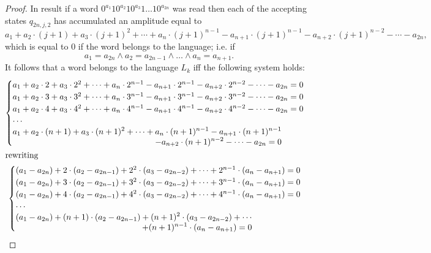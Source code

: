 \documentclass{llncs}
\begin{document}
\begin{proof}
In result if a word $0^{a_1}10^{a_2}10^{a_3}1\ldots 10^{a_{2n}}$ was read then each of the accepting states $q_{2n,j,2}$ has accumulated an amplitude equal to
\[
	a_1 + a_2 \cdot (j + 1) + a_3 \cdot (j + 1)^2 + \cdots + a_n \cdot (j + 1)^{n - 1} - a_{n+1} \cdot (j + 1)^{n - 1} - a_{n+2} \cdot (j + 1)^{n - 2} - \cdots - a_{2n},
\]
which is equal to $0$ if the word belongs to the language; i.e. if
\[
	a_1 = a_{2n} \wedge a_2 = a_{2n-1} \wedge \ldots \wedge a_n = a_{n+1}.
\]
It follows that a word belongs to the language $L_k$ iff the following system holds:
\begin{gather*}
\allowdisplaybreaks
	\begin{cases}
		a_1 + a_2 \cdot 2 + a_3 \cdot 2^2 + \cdots + a_n \cdot 2^{n - 1} - a_{n+1} \cdot 2^{n - 1} - a_{n+2} \cdot 2^{n - 2} - \cdots - a_{2n} = 0 \\
		a_1 + a_2 \cdot 3 + a_3 \cdot 3^2 + \cdots + a_n \cdot 3^{n - 1} - a_{n+1} \cdot 3^{n - 1} - a_{n+2} \cdot 3^{n - 2} - \cdots - a_{2n} = 0\\
		a_1 + a_2 \cdot 4 + a_3 \cdot 4^2 + \cdots + a_n \cdot 4^{n - 1} - a_{n+1} \cdot 4^{n - 1} - a_{n+2} \cdot 4^{n - 2} - \cdots - a_{2n} = 0\\
		\cdots \\
		\begin{split}
		a_1 + a_2 \cdot (n + 1) + a_3 \cdot (n + 1)^2 + \cdots + a_n \cdot (n + 1)^{n - 1} - a_{n+1} \cdot (n + 1)^{n - 1} \\
		\qquad- a_{n+2} \cdot (n + 1)^{n - 2} - \cdots - a_{2n} = 0\\
		\end{split}
	\end{cases}\\
\intertext{rewriting}
	\begin{cases}
		(a_1 - a_{2n}) + 2 \cdot (a_2 - a_{2n-1}) + 2^2 \cdot (a_3 - a_{2n-2}) + \cdots + 2^{n - 1} \cdot (a_n - a_{n+1}) = 0\\
		(a_1 - a_{2n}) + 3 \cdot (a_2 - a_{2n-1}) + 3^2 \cdot (a_3 - a_{2n-2}) + \cdots + 3^{n - 1} \cdot (a_n - a_{n+1}) = 0\\
		(a_1 - a_{2n}) + 4 \cdot (a_2 - a_{2n-1}) + 4^2 \cdot (a_3 - a_{2n-2}) + \cdots + 4^{n - 1} \cdot (a_n - a_{n+1}) = 0\\
		\cdots \\
		\begin{split}
		(a_1 - a_{2n}) + (n + 1) \cdot (a_2 - a_{2n-1}) + (n + 1)^2 \cdot (a_3 - a_{2n-2}) + \cdots \\
		\qquad+ (n + 1)^{n - 1} \cdot (a_n - a_{n+1}) = 0\\
		\end{split}	
	\end{cases}
\end{gather*}


\end{proof}
\end{document}
